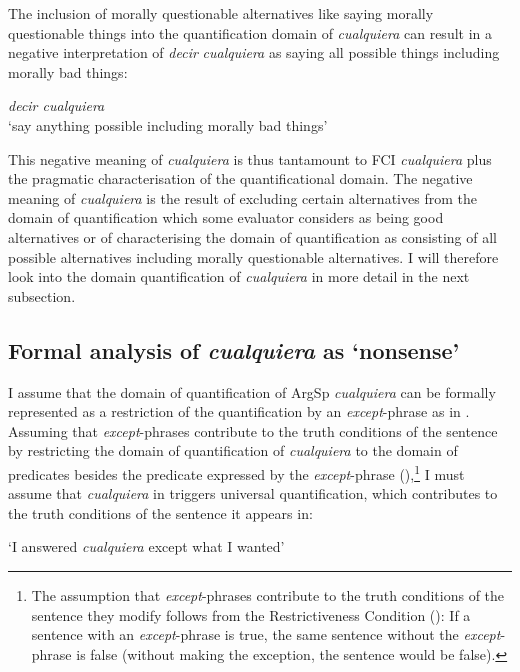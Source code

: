 The inclusion of morally questionable alternatives like saying morally questionable things into the quantification domain of \textit{cualquiera} can result in a negative interpretation of \textit{decir} \textit{cualquiera} as saying all possible things including morally bad things:

\ea 
\label{ex:key:237} %
     \textit{decir cualquiera} \\
     ‘say anything possible including morally bad things’
\z

This negative meaning of \textit{cualquiera} is thus tantamount to FCI \textit{cualquiera} plus the pragmatic characterisation of the quantificational domain. The negative meaning of \textit{cualquiera} is the result of excluding certain alternatives from the domain of quantification which some evaluator considers as being good alternatives or of characterising the domain of quantification as consisting of all possible alternatives including morally questionable alternatives. I will therefore look into the domain quantification of \textit{cualquiera} in more detail in the next subsection.

\subsection{{Formal} {analysis} {of} {\textit{cualquiera}} {as} {‘nonsense’}} \label{sec:4.5.3}

I assume that the domain of quantification of ArgSp \textit{cualquiera} can be formally represented as a restriction of the quantification by an \textit{except}{}-phrase as in . Assuming that \textit{except}{}-phrases contribute to the truth conditions of the sentence by restricting the domain of quantification of \textit{cualquiera} to the domain of predicates besides the predicate expressed by the \textit{except}{}-phrase (\citealt{Fintel1994}),\footnote{{The assumption that} {\textit{except}}{{}-phrases contribute to the truth conditions of the sentence they modify follows from the Restrictiveness Condition (\citealt{Fintel1994}): If a sentence with an} {\textit{except}}{{}-phrase is true, the same sentence without the} {\textit{except}}{{}-phrase is false (without making the exception, the sentence would be false).}} I must assume that \textit{cualquiera} in   triggers universal quantification, which contributes to the truth conditions of the sentence it appears in:

\ea \label{bkm:Ref63461516} %
‘I answered \textit{cualquiera} except what I wanted’

